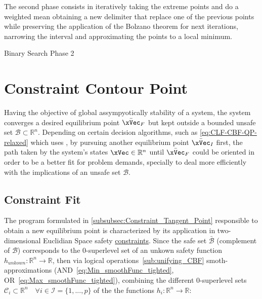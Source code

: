 The second phase consists in iteratively taking the extreme points and do a weighted mean obtaining a new delimiter that replace one of the previous points while preserving the application of the Bolzano theorem for next iterations, narrowing the interval and approximating the points to a local minimum.   

  \begin{algorithm}
    \caption{Binary Search Phase 2} \label{alg:Binary_Search_Phase_2}
  \end{algorithm}



\newpage %


\section{Constraint Contour Point}
\label{sec:Constraint_Contour_Point}

Having the objective of global assympyotically stability of a system, the system converges a desired equilibrium point \(\bar{\xVec}_F\) but kept outside a bounded unsafe set \(\mathcal{B} \subset \mathbb{R}^n\). Depending on certain decision algorithms, such as \ref{eq:CLF-CBF-QP-relaxed} which uses , by pursuing another equilibrium point \(\bar{\xVec}_I\) first, the path taken by the system's states \(\xVec \in \mathbb{R}^n\) until \(\bar{\xVec}_F\) could be oriented in order to be a better fit for problem demands, specially to deal more efficiently with the implications of an unsafe set \(\mathcal{B}\).\\

\subsection{Constraint Fit}
\label{subsec:Constraint_Fit}

The program formulated in \ref{subsubsec:Constraint_Tangent_Point} responsible to obtain a new equilibrium point is characterized by its application in two-dimensional Euclidian Space safety \underline{constraints}. Since the safe set \(\bar{\mathcal{B}}\) (complement of \(\mathcal{B}\)) corresponds to the 0-superlevel set of an unkown safety function \(h_{unkown}: \mathbb{R}^n \to \mathbb{R}\), then via logical operations~\ref{sub:unifying_CBF} smoth-approximations (AND~\ref{eq:Min_smoothFunc_tighted}, OR~\ref{eq:Max_smoothFunc_tighted}), combining the different 0-superlevel sets \(\mathcal{C}_i \subset \mathbb{R}^n \quad \forall i \in \mathcal{I} = \{1,...,p\}\) of the the functions \(h_i: \mathbb{R}^n \to \mathbb{R}\):

